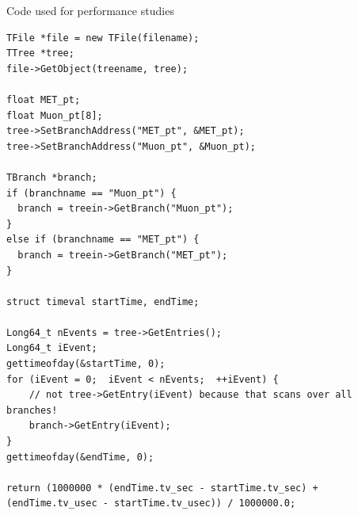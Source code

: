 \documentclass[aspectratio=169]{beamer}
\begin{document}
\begin{frame}[fragile]{Code used for performance studies}
\vspace{0.25 cm}
\scriptsize

\begin{verbatim}
TFile *file = new TFile(filename);
TTree *tree;
file->GetObject(treename, tree);

float MET_pt;
float Muon_pt[8];
tree->SetBranchAddress("MET_pt", &MET_pt);
tree->SetBranchAddress("Muon_pt", &Muon_pt);

TBranch *branch;
if (branchname == "Muon_pt") {
  branch = treein->GetBranch("Muon_pt");
}
else if (branchname == "MET_pt") {
  branch = treein->GetBranch("MET_pt");
}

struct timeval startTime, endTime;

Long64_t nEvents = tree->GetEntries();
Long64_t iEvent;
gettimeofday(&startTime, 0);
for (iEvent = 0;  iEvent < nEvents;  ++iEvent) {
    // not tree->GetEntry(iEvent) because that scans over all branches!
    branch->GetEntry(iEvent);
}
gettimeofday(&endTime, 0);

return (1000000 * (endTime.tv_sec - startTime.tv_sec) + (endTime.tv_usec - startTime.tv_usec)) / 1000000.0;
\end{verbatim}
\end{frame}
\end{document}

